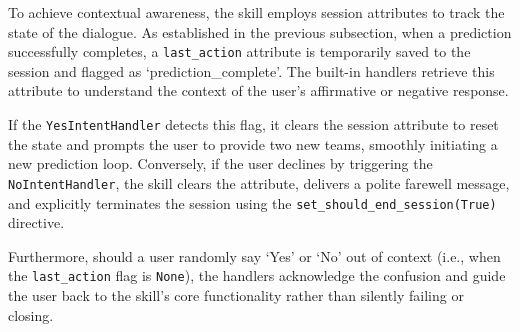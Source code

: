 To achieve contextual awareness, the skill employs session attributes to track the state of the dialogue. As established in the previous subsection, when a prediction successfully completes, a \texttt{last\_action} attribute is temporarily saved to the session and flagged as `prediction\_complete'. The built-in handlers retrieve this attribute to understand the context of the user's affirmative or negative response.

If the \texttt{YesIntentHandler} detects this flag, it clears the session attribute to reset the state and prompts the user to provide two new teams, smoothly initiating a new prediction loop. Conversely, if the user declines by triggering the \texttt{NoIntentHandler}, the skill clears the attribute, delivers a polite farewell message, and explicitly terminates the session using the \texttt{set\_should\_end\_session(True)} directive.

Furthermore, should a user randomly say `Yes' or `No' out of context (i.e., when the \texttt{last\_action} flag is \texttt{None}), the handlers acknowledge the confusion and guide the user back to the skill's core functionality rather than silently failing or closing.

